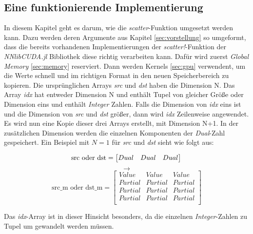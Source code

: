 \subsection{Eine funktionierende Implementierung} \label{sec:funktional_implementaion}

In diesem Kapitel geht es darum, wie die \textit{scatter}-Funktion umgesetzt werden kann.
Dazu werden deren Argumente aus Kapitel \ref{sec:vorstellung} so
umgeformt, 
dass die bereits vorhandenen Implementierungen der \textit{scatter!}-Funktion der \textit{NNlibCUDA.jl} \cite{nnlibcuda} Bibliothek 
diese richtig verarbeiten kann.
Dafür wird zuerst \textit{Global Memory} \ref{sec:memory} reserviert. Dann werden Kernels \ref{sec:gpu} verwendent, 
um die Werte schnell und im richtigen Format in den neuen Speicherbereich zu kopieren.
Die ursprünglichen Arrays \textit{src} und \textit{dst} haben die Dimension N.
Das Array \textit{idx} hat entweder Dimension N und enthält Tupel von gleicher Größe
oder Dimension eins und enthält \textit{Integer} Zahlen.
Falls die Dimension von \textit{idx} eins ist und die Dimension von \textit{src}
und \textit{dst} größer, dann wird \textit{idx} Zeilenweise angewendet.
Es wird nun eine Kopie dieser drei Arrays erstellt, mit Dimension N+1.
In der zusätzlichen Dimension werden die einzelnen Komponenten der \textit{Dual}-Zahl gespeichert.
Ein Beispiel mit $N = 1$ für \textit{src} und \textit{dst} sieht wie folgt aus:

\begin{equation}
  \text{src oder dst} = 
\begin{bmatrix}
Dual & Dual & Dual\\
\end{bmatrix}\\  
\end{equation}
$$\rightarrow$$
\begin{equation}
    \text{src\_m oder dst\_m} = 
\begin{bmatrix}
Value   & Value   & Value   \\
Partial & Partial & Partial \\
Partial & Partial & Partial \\
Partial & Partial & Partial \\
\end{bmatrix}
\end{equation}

Das \textit{idx}-Array ist in dieser Hinsicht besonders,
da die einzelnen \textit{Integer}-Zahlen zu Tupel um gewandelt werden müssen.

